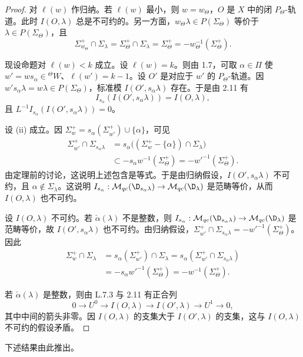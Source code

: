 \begin{proof}
对 $\ell(w)$ 作归纳。若 $\ell(w)$ 最小，则 $w=w_\Theta$，$O$ 是 $X$ 中的闭 $P_\Theta$-轨道。此时 $I(O,\lambda)$ 总是不可约的。另一方面，$w_\Theta\lambda\in P(\Sigma_\Theta)$ 等价于 $\lambda\in P(\Sigma_\Theta)$，且
$$\Sigma^+_{w_\Theta}\cap\Sigma_\lambda=\Sigma^+_\Theta\cap\Sigma_\lambda=\Sigma^+_\Theta=-w_\Theta^{-1}(\Sigma^+_\Theta).$$

现设命题对 $\ell(w)<k$ 成立。设 $\ell(w)=k$。则由 1.7，可取 $\alpha\in\Pi$ 使 $w'=ws_\alpha\in{}^{\Theta}W$、$\ell(w')=k-1$。设 $O'$ 是对应于 $w'$ 的 $P_\Theta$-轨道。因 $w's_\alpha\lambda=w\lambda\in P(\Sigma_\Theta)$，标准模 $I(O',s_\alpha\lambda)$ 存在。于是由 2.11 有
$$I_{s_\alpha}(I(O',s_\alpha\lambda))=I(O,\lambda),$$
且 $L^{-1}I_{s_\alpha}(I(O',s_\alpha\lambda))=0$。

设 (ii) 成立。因 $\Sigma^+_w=s_\alpha(\Sigma^+_{w'})\cup\{\alpha\}$，可见
\begin{align*}
\Sigma^+_{w'}\cap\Sigma_{s_\alpha\lambda}&=s_\alpha\bigl((\Sigma^+_w-\{\alpha\})\cap\Sigma_\lambda\bigr)\\
&\subset-s_\alpha w^{-1}(\Sigma^+_\Theta)=-w'^{-1}(\Sigma^+_\Theta).
\end{align*}
由定理前的讨论，这说明上述包含是等式。于是由归纳假设，$I(O',s_\alpha\lambda)$ 不可约，且 $\alpha\notin\Sigma_\lambda$。这说明 $I_{s_\alpha}:\mathcal{M}_{qc}(\D_{s_\alpha\lambda})\to\mathcal{M}_{qc}(\D_\lambda)$ 是范畴等价，从而 $I(O,\lambda)$ 也不可约。

设 $I(O,\lambda)$ 不可约。若 $\check\alpha(\lambda)$ 不是整数，则 $I_{s_\alpha}:\mathcal{M}_{qc}(\D_{s_\alpha\lambda})\to\mathcal{M}_{qc}(\D_\lambda)$ 是范畴等价，故 $I(O',s_\alpha\lambda)$ 也不可约。由归纳假设，$\Sigma^+_{w'}\cap\Sigma_{s_\alpha\lambda}=-w'^{-1}(\Sigma^+_\Theta)$。因此
\begin{align*}
\Sigma^+_w\cap\Sigma_\lambda&=s_\alpha(\Sigma^+_{w'})\cap\Sigma_\lambda=s_\alpha(\Sigma^+_{w'}\cap\Sigma_{s_\alpha\lambda})\\
&=-s_\alpha w'^{-1}(\Sigma^+_\Theta)=-w^{-1}(\Sigma^+_\Theta).
\end{align*}

若 $\check\alpha(\lambda)$ 是整数，则由 L.7.3 与 2.11 有正合列
$$0\longrightarrow U^0\longrightarrow I(O,\lambda)\longrightarrow I(O',\lambda)\longrightarrow U^1\longrightarrow0,$$
其中中间的箭头非零。因 $I(O,\lambda)$ 的支集大于 $I(O',\lambda)$ 的支集，这与 $I(O,\lambda)$ 不可约的假设矛盾。
\end{proof}

下述结果由此推出。

